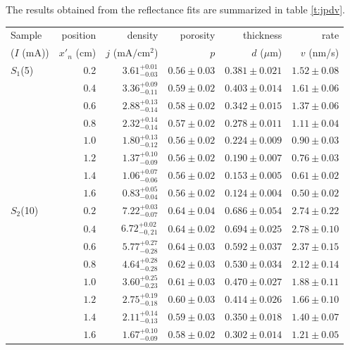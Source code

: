 \documentclass[review,sort&compress]{cas-sc}
\begin{document}
The results obtained from the reflectance fits are summarized in table
\ref{t:jpdv}.
\begin{table}
\centering
\renewcommand{\arraystretch}{1.1}
\begin{tabular}{lrrrrr}
  Sample & position & density & porosity &
  thickness & rate\\
  ($I$ (mA)) &$x'_n$ (cm)&  $j$ ($\text{mA}/\text{cm}^2$) & $p$
       & $d$ ($\mu\text{m}$) & $v$ (nm/s)\\
\hline
$S_1$(5) &0.2 &$ 3.61^{+0.01}_{-0.03}   $&$0.56\pm0.03$ &$0.381\pm0.021$ &$  1.52\pm0.08$ \\
         &0.4 &$ 3.36^{+0.09}_{-0.11}   $&$0.59\pm0.02$ &$0.403\pm0.014$ &$  1.61\pm0.06$  \\
         &$0.6$  &$ 2.88^{+0.13}_{-0.14}$&$0.58\pm0.02$ &$0.342\pm0.015$ &$  1.37\pm0.06$ \\
         &$0.8$ &$ 2.32^{+0.14}_{-0.14} $&$0.57\pm0.02$ &$0.278\pm0.011$ &$  1.11\pm0.04$ \\
         &$1.0$ &$ 1.80^{+0.13}_{-0.12} $&$0.56\pm0.02$ &$0.224\pm0.009$ &$  0.90\pm0.03$ \\
         &$1.2$ &$ 1.37^{+0.10}_{-0.09} $&$0.56\pm0.02$ &$0.190\pm0.007$ &$  0.76\pm0.03$ \\
         &$1.4$ &$ 1.06^{+0.07}_{-0.06} $&$0.56\pm0.02$ &$0.153\pm0.005$ &$  0.61\pm0.02$ \\
         &$1.6$ &$ 0.83^{+0.05}_{-0.04} $&$0.56\pm0.02$ &$0.124\pm0.004$ &$  0.50\pm0.02$ \\
$S_2$(10) &$0.2$ &$ 7.22^{+0.03}_{-0.07}$&$0.64\pm0.04$ &$0.686\pm0.054$ &$  2.74\pm0.22$ \\
         &$0.4$ &$ 6.72^{+0.02}_{-0,21} $&$0.64\pm0.02$ &$0.694\pm0.025$ &$  2.78\pm0.10$ \\
         &$0.6$ &$ 5.77^{+0.27}_{-0.28} $&$0.64\pm0.03$ &$0.592\pm0.037$ &$  2.37\pm0.15$ \\
         &$0.8$ &$ 4.64^{+0.28}_{-0.28} $&$0.62\pm0.03$ &$0.530\pm0.034$ &$  2.12\pm0.14$ \\
         &$1.0$ &$ 3.60^{+0.25}_{-0.23} $&$0.61\pm0.03$ &$0.470\pm0.027$ &$  1.88\pm0.11$ \\
         &$1.2$ &$ 2.75^{+0.19}_{-0.18} $&$0.60\pm0.03$ &$0.414\pm0.026$ &$  1.66\pm0.10$ \\
         &$1.4$ &$ 2.11^{+0.14}_{-0.13} $&$0.59\pm0.03$ &$0.350\pm0.018$ &$  1.40\pm0.07$ \\
         &$1.6$ &$ 1.67^{+0.10}_{-0.09} $&$0.58\pm0.02$ &$0.302\pm0.014$ &$  1.21\pm0.05$ \\

\end{tabular}
\end{table}
\end{document}
